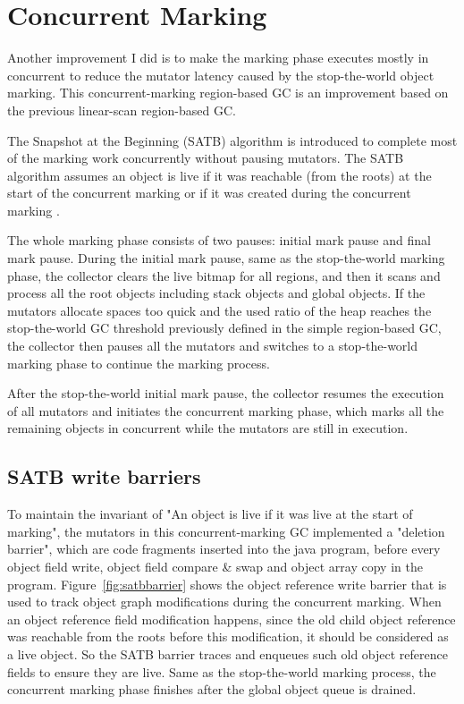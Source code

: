 \section{Concurrent Marking}
\label{sec:concmarkgc}

Another improvement I did is to make the marking phase executes mostly in concurrent to reduce the
mutator latency caused by the stop-the-world object marking.
This concurrent-marking region-based GC is an improvement based on the previous linear-scan region-based GC.

The Snapshot at the Beginning (SATB) algorithm \cite{yuasa1990real} is introduced to
complete most of the marking work concurrently without pausing mutators. The SATB algorithm assumes an object is live if it was reachable (from the roots)
at the start of the concurrent marking or if it was created during the concurrent marking \cite{yuasa1990real}.

The whole marking phase consists of two pauses: initial mark pause and final mark pause.
During the initial mark pause, same as the stop-the-world marking phase,
the collector clears the live bitmap for all regions,
and then it scans and process all the root objects including stack objects and global objects.
If the mutators allocate spaces too quick and the used ratio of the heap reaches
the stop-the-world GC threshold previously defined in the simple region-based GC, the
collector then pauses all the mutators and switches to a stop-the-world marking phase
to continue the marking process.

After the stop-the-world initial mark pause, the collector resumes the execution of all mutators and
initiates the concurrent marking phase, which marks all the remaining objects in concurrent
while the mutators are still in execution.

\subsection{SATB write barriers}

To maintain the invariant of "An object is live if it was live at the start of marking",
the mutators in this concurrent-marking GC implemented a "deletion barrier", which are code
fragments inserted into the java program, before every object field write, object field compare \& swap
and object array copy in the program. Figure~\ref{fig:satbbarrier} shows the object reference write barrier that is used
to track object graph modifications during the concurrent marking.
When an object reference field modification happens, since the old child object reference
was reachable from the roots before this modification, it should be considered as a live object.
So the SATB barrier traces and enqueues such old object reference fields to ensure they are live.
Same as the stop-the-world marking process, the concurrent marking phase finishes after
the global object queue is drained.

